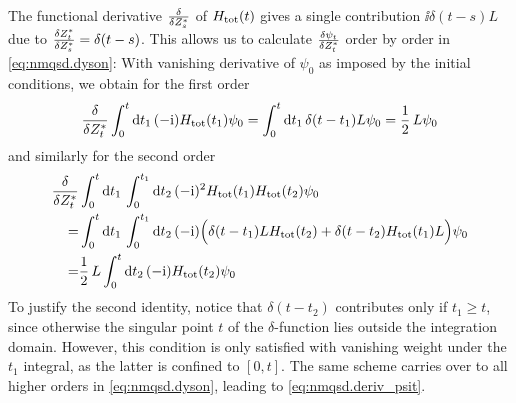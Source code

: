 The functional derivative $\frac{\delta}{\delta {Z}^*_s}$ of $H_\mathrm{tot}(t)$ gives a single contribution $\ii \delta(t - s) L$ due to $\frac{\delta {Z}^*_t}{\delta {Z}^*_s} = \delta(t - s)$.
This allows us to calculate $\frac{\delta \psi_t}{\delta {Z}^*_t}$ order by order in \autoref{eq:nmqsd.dyson}:
With vanishing derivative of $\psi_0$ as imposed by the initial conditions, we obtain for the first order
\begin{equation*}
  \frac{\delta}{\delta{Z}^*_t} \int_{0}^{t}\mathrm{d}t_1\, (-\mathrm{i}) H_\mathrm{tot}(t_1) \psi_0 = \int_{0}^{t}\mathrm{d}t_1\, \delta(t - t_1) L \psi_0 = \frac{1}{2} \, L \psi_0
\end{equation*}
and similarly for the second order
\begin{align*}
  \frac{\delta}{\delta{Z}^*_t} &\int_{0}^{t}\mathrm{d}t_1\,\int_{0}^{t_1}\mathrm{d}t_2\, (-\mathrm{i})^2 H_\mathrm{tot}(t_1)H_\mathrm{tot}(t_2)\psi_0 \\
  =&\int_{0}^{t}\mathrm{d}t_1\,\int_{0}^{t_1}\mathrm{d}t_2\, (-\mathrm{i}) \Big( \delta(t - t_1)L H_\mathrm{tot}(t_2) + \delta(t - t_2) H_\mathrm{tot}(t_1) L \Big)\psi_0 \\
  =& \frac{1}{2}\,L \int_{0}^{t}\mathrm{d}t_2\, (-\mathrm{i}) H_\mathrm{tot}(t_2)\psi_0
\end{align*}
To justify the second identity, notice that $\delta(t - t_2)$ contributes only if $t_1 \ge t$, since otherwise the singular point $t$ of the $\delta$-function lies outside the integration domain.
However, this condition is only satisfied with vanishing weight under the $t_1$ integral, as the latter is confined to $[0,t]$.
The same scheme carries over to all higher orders in \autoref{eq:nmqsd.dyson}, leading to \autoref{eq:nmqsd.deriv_psit}.\\




